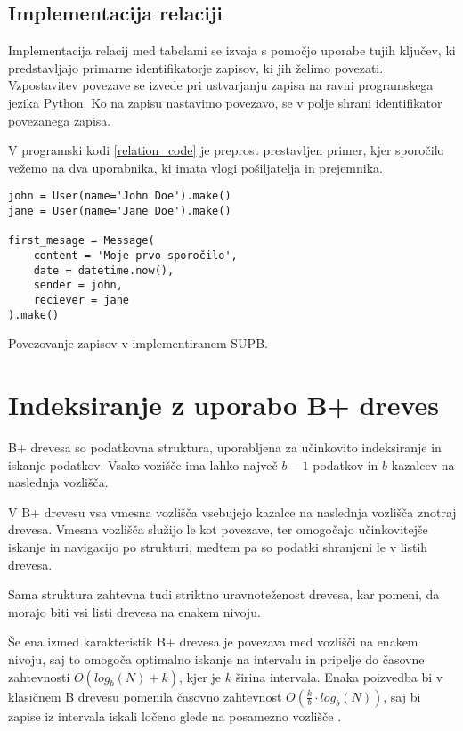 \documentclass[a4paper,12pt,openright]{book}
\begin{document}
        \subsection{Implementacija relaciji}

        Implementacija relacij med tabelami se izvaja s pomočjo uporabe tujih ključev, ki predstavljajo primarne identifikatorje zapisov, ki jih želimo povezati. Vzpostavitev povezave se izvede pri ustvarjanju zapisa na ravni programskega jezika Python. Ko na zapisu nastavimo povezavo, se v polje shrani identifikator povezanega zapisa.

        V programski kodi \ref{relation_code} je preprost prestavljen primer, kjer sporočilo vežemo na dva uporabnika, ki imata vlogi pošiljatelja in prejemnika.

\begin{code}
\begin{verbatim}
john = User(name='John Doe').make()
jane = User(name='Jane Doe').make()

first_mesage = Message(
    content = 'Moje prvo sporočilo',
    date = datetime.now(),
    sender = john,
    reciever = jane
).make()
\end{verbatim}
\caption{Povezovanje zapisov v implementiranem SUPB.}
\label{relation_code}
\end{code}

    \section{Indeksiranje z uporabo B+ dreves}

        B+ drevesa so podatkovna struktura, uporabljena za učinkovito indeksiranje in iskanje podatkov. Vsako vozišče ima lahko največ $b - 1$ podatkov in $b$ kazalcev na naslednja vozlišča.

        V B+ drevesu vsa vmesna vozlišča vsebujejo kazalce na naslednja vozlišča znotraj drevesa. Vmesna vozlišča služijo le kot povezave, ter omogočajo učinkovitejše iskanje in navigacijo po strukturi, medtem pa so podatki shranjeni le v listih drevesa.

        Sama struktura zahtevna tudi striktno uravnoteženost drevesa, kar pomeni, da morajo biti vsi listi drevesa na enakem nivoju.

        Še ena izmed karakteristik B+ drevesa je povezava med vozlišči na enakem nivoju, saj to omogoča optimalno iskanje na intervalu in pripelje do časovne zahtevnosti $O(log_b(N) + k)$, kjer je $k$ širina intervala. Enaka poizvedba bi v klasičnem B drevesu pomenila časovno zahtevnost $O(\frac{k}{b} \cdot log_b(N))$, saj bi zapise iz intervala iskali ločeno glede na posamezno vozlišče \cite{BPTREE}.
\end{document}
